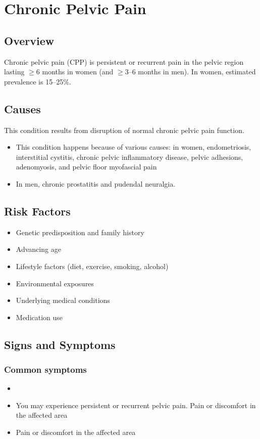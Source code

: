 \chapter{Chronic Pelvic Pain}
\label{sec:Chronic Pelvic Pain}

\section{Overview}
Chronic pelvic pain (CPP) is persistent or recurrent pain in the pelvic region lasting $\ge$6 months in women (and $\ge$3--6 months in men). In women, estimated prevalence is 15--25\%.
\section{Causes}
This condition results from disruption of normal chronic pelvic pain function.

\begin{itemize}[noitemsep]
  \item This condition happens because of various causes: in women, endometriosis, interstitial cystitis, chronic pelvic inflammatory disease, pelvic adhesions, adenomyosis, and pelvic floor myofascial pain
  \item In men, chronic prostatitis and pudendal neuralgia.
\end{itemize}
\section{Risk Factors}


\begin{itemize}[noitemsep]
  \item Genetic predisposition and family history
  \item Advancing age
  \item Lifestyle factors (diet, exercise, smoking, alcohol)
  \item Environmental exposures
  \item Underlying medical conditions
  \item Medication use
\end{itemize}
\section{Signs and Symptoms}

\subsection{Common symptoms}
\begin{itemize}[noitemsep]
  \item \item You may experience persistent or recurrent pelvic pain. Pain or discomfort in the affected area    \item Pain or discomfort in the affected area
  \end{itemize}

